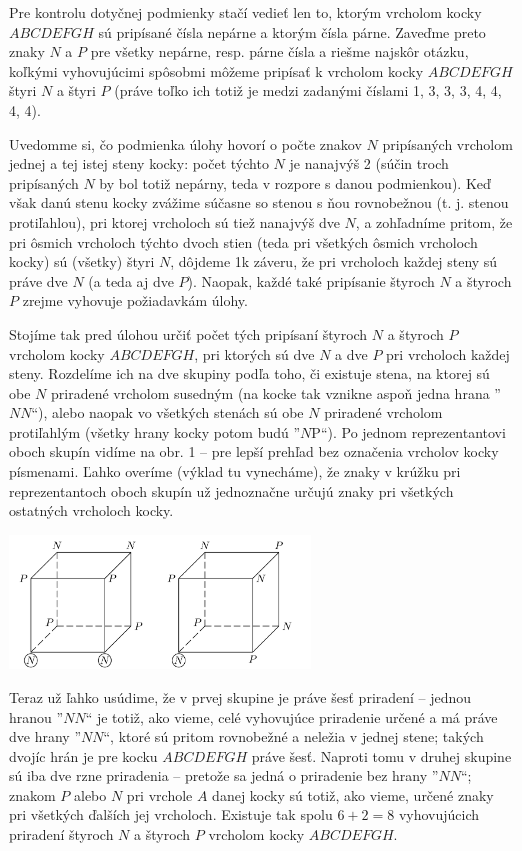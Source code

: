 \rieh Pre kontrolu dotyčnej podmienky stačí vedieť len to, ktorým vrcholom kocky $ABCDEFGH$ sú pripísané čísla nepárne a ktorým čísla párne. Zaveďme preto znaky $N$ a $P$ pre všetky nepárne, resp. párne čísla a riešme najskôr otázku, koľkými vyhovujúcimi spôsobmi môžeme pripísať k vrcholom kocky $ABCDEFGH$ štyri $N$ a štyri $P$ (práve toľko ich totiž je medzi zadanými číslami 1, 3, 3, 3, 4, 4, 4, 4).

Uvedomme si, čo podmienka úlohy hovorí o počte znakov $N$ pripísaných vrcholom jednej a tej istej steny kocky: počet týchto $N$ je nanajvýš 2 (súčin troch pripísaných $N$ by bol totiž nepárny, teda v rozpore s danou podmienkou). Keď však danú stenu kocky zvážime súčasne so stenou s ňou rovnobežnou (t. j. stenou protiľahlou), pri ktorej vrcholoch sú tiež nanajvýš dve $N$, a zohľadníme pritom, že pri ôsmich vrcholoch týchto dvoch stien (teda pri všetkých ôsmich vrcholoch kocky) sú (všetky) štyri $N$, dôjdeme 1k záveru, že pri vrcholoch každej steny sú práve dve $N$ (a teda aj dve $P$). Naopak, každé také pripísanie štyroch $N$ a štyroch $P$ zrejme vyhovuje požiadavkám úlohy.

Stojíme tak pred úlohou určiť počet tých pripísaní štyroch $N$ a štyroch $P$ vrcholom kocky $ABCDEFGH$, pri ktorých sú dve $N$ a dve $P$ pri vrcholoch každej steny. Rozdelíme ich na dve skupiny podľa toho, či existuje stena, na ktorej sú obe $N$
priradené vrcholom susedným (na kocke tak vznikne aspoň jedna hrana ”$NN$“), alebo naopak vo všetkých stenách sú obe $N$ priradené vrcholom protiľahlým (všetky hrany kocky potom budú
”$N$P“). Po jednom reprezentantovi oboch skupín vidíme na obr. 1 -- pre lepší prehľad bez označenia vrcholov kocky písmenami. Ľahko overíme (výklad tu vynecháme), že znaky v krúžku pri reprezentantoch oboch skupín už jednoznačne určujú znaky pri všetkých ostatných vrcholoch kocky.
\begin{center}
\includegraphics[width=0.6\textwidth]{NPkocka}
\end{center}

Teraz už ľahko usúdime, že v prvej skupine je práve šesť priradení -- jednou hranou ”$NN$“ je totiž, ako vieme, celé vyhovujúce priradenie určené a má práve dve hrany ”$NN$“, ktoré sú pritom rovnobežné a neležia v jednej stene; takých dvojíc hrán je pre kocku $ABCDEFGH$ práve šesť. Naproti tomu v druhej skupine sú iba dve rzne priradenia -- pretože sa jedná o priradenie bez hrany ”$NN$“; znakom $P$ alebo $N$ pri vrchole $A$ danej kocky sú totiž, ako vieme, určené znaky pri všetkých ďalších jej vrcholoch. Existuje tak spolu $6 + 2 = 8$ vyhovujúcich priradení štyroch $N$ a štyroch $P$ vrcholom kocky $ABCDEFGH$.

